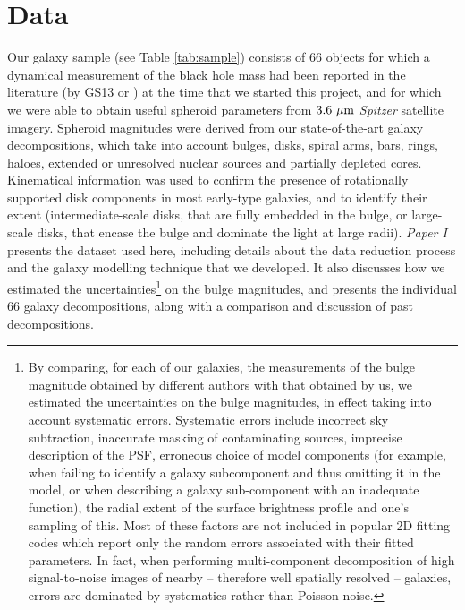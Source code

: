 \documentclass[preprint2]{emulateapj}
\begin{document}
\section{Data}
\label{sec:data}
Our galaxy sample (see Table \ref{tab:sample}) 
consists of 66 objects for which a dynamical measurement of the black hole mass had been reported in the literature 
(by GS13 or \citealt{rusli2013bhmassesDM}) at the time that we started this project, 
and for which we were able to obtain useful spheroid parameters from $3.6\rm~\mu m$ \emph{Spitzer} satellite imagery. 
Spheroid magnitudes were derived from our state-of-the-art galaxy decompositions, which take into account 
bulges, disks, spiral arms, bars, rings, haloes, extended or unresolved nuclear sources and partially depleted cores.
Kinematical information \citep{atlas3dIII-MNRAS,scott2014,arnold2014} was used 
to confirm the presence of rotationally supported disk components in most early-type galaxies, 
and to identify their extent 
(intermediate-scale disks, that are fully embedded in the bulge, 
or large-scale disks, that encase the bulge and dominate the light at large radii). 
\emph{Paper I} presents the dataset used here, 
including details about the data reduction process and the galaxy modelling technique that we developed. 
It also discusses how we estimated the uncertainties\footnote{By comparing, for each of our galaxies, the measurements of the bulge magnitude 
obtained by different authors with that obtained by us, we estimated the uncertainties on the bulge magnitudes, 
in effect taking into account systematic errors. 
Systematic errors include incorrect sky subtraction, inaccurate masking of contaminating sources, imprecise description of the PSF, 
erroneous choice of model components (for example, when failing to identify a galaxy subcomponent and thus omitting it in the model, 
or when describing a galaxy sub-component with an inadequate function), 
the radial extent of the surface brightness profile and one's sampling of this. 
Most of these factors are not included in popular 2D fitting codes which report only the random errors associated with their fitted parameters. 
In fact, when performing multi-component decomposition of high signal-to-noise images of nearby -- therefore well spatially resolved -- galaxies, 
errors are dominated by systematics rather than Poisson noise.} 
on the bulge magnitudes, and presents the individual 66 galaxy decompositions, 
along with a comparison and discussion of past decompositions. \\
\end{document}
